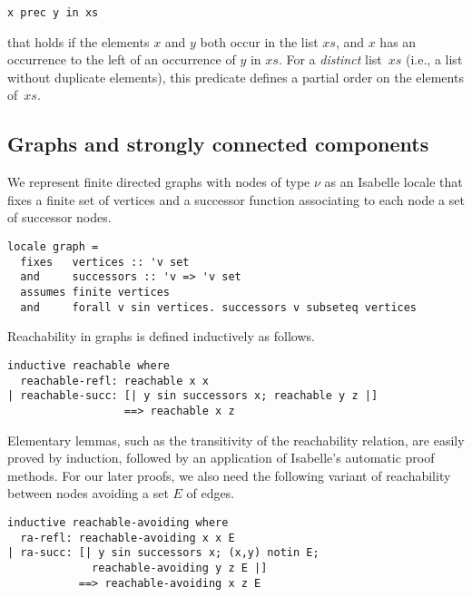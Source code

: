 \documentclass[sigplan,10pt,anonymous,review]{acmart}
\newcommand{\prog}[1]{\textit{#1}}
\begin{document}
\begin{small}
\begin{lstlisting}[language=isabelle]
  x prec y in xs
\end{lstlisting}
\end{small}
%
that holds if the elements $x$ and $y$ both occur in the list $xs$, and $x$ has an occurrence to the left of an occurrence of $y$ in $xs$. For a \prog{distinct} list~$xs$ (i.e., a list without duplicate elements), this predicate defines a partial order on the elements of~$xs$.


\subsection{Graphs and strongly connected components}
\label{sec:graphs}

We represent finite directed graphs with nodes of type $\nu$ as an Isabelle locale that fixes a finite set of vertices and a successor function associating to each node a set of successor nodes.

\begin{small}
\begin{lstlisting}[language=isabelle]
locale graph =
  fixes   vertices :: 'v set
  and     successors :: 'v => 'v set
  assumes finite vertices  
  and     forall v sin vertices. successors v subseteq vertices
\end{lstlisting}
\end{small}

Reachability in graphs is defined inductively as follows.

\begin{small}
\begin{lstlisting}[language=isabelle]
inductive reachable where
  reachable-refl: reachable x x
| reachable-succ: [| y sin successors x; reachable y z |]
                  ==> reachable x z
\end{lstlisting}
\end{small}

Elementary lemmas, such as the transitivity of the reachability relation, are easily proved by induction, followed by an application of Isabelle's automatic proof methods. For our later proofs, we also need the following variant of reachability between nodes avoiding a set $E$ of edges.

\begin{small}
\begin{lstlisting}[language=isabelle]
inductive reachable-avoiding where
  ra-refl: reachable-avoiding x x E
| ra-succ: [| y sin successors x; (x,y) notin E; 
             reachable-avoiding y z E |] 
           ==> reachable-avoiding x z E
\end{lstlisting}
\end{small}
\end{document}
